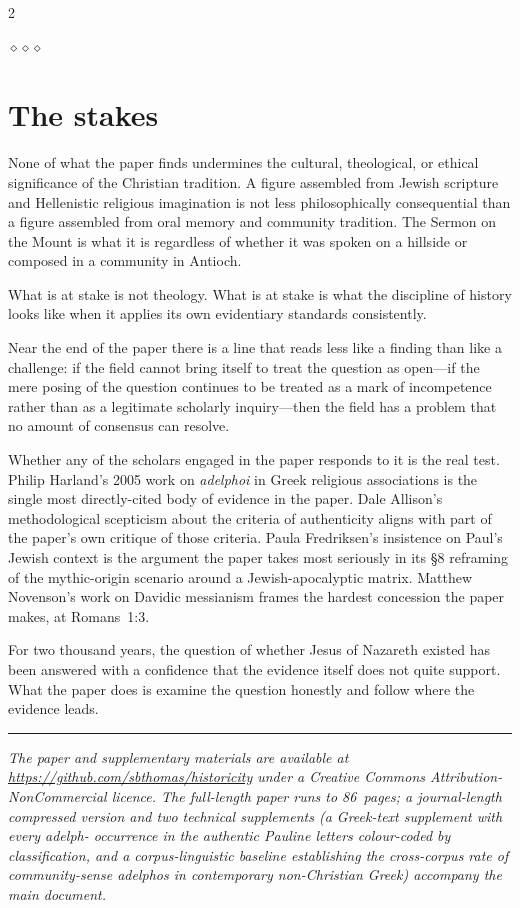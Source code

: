 \documentclass[11pt,oneside]{article}
\newcommand{\sectbreak}{%
  \par\vspace{1.3em}
  \noindent\hfil
  {\color{accent}$\diamond$\hspace{0.5em}$\diamond$\hspace{0.5em}$\diamond$}%
  \hfil\par\vspace{1em}}
\begin{document}
\begin{multicols}{2}
\sectbreak
\section*{The stakes}

None of what the paper finds undermines the cultural, theological,
or ethical significance of the Christian tradition.  A figure
assembled from Jewish scripture and Hellenistic religious
imagination is not less philosophically consequential than a figure
assembled from oral memory and community tradition.  The Sermon on
the Mount is what it is regardless of whether it was spoken on a
hillside or composed in a community in Antioch.

What is at stake is not theology.  What is at stake is what the
discipline of history looks like when it applies its own evidentiary
standards consistently.

Near the end of the paper there is a line that reads less like a
finding than like a challenge: if the field cannot bring itself to
treat the question as open---if the mere posing of the question
continues to be treated as a mark of incompetence rather than as a
legitimate scholarly inquiry---then the field has a problem that no
amount of consensus can resolve.

Whether any of the scholars engaged in the paper responds to it is
the real test.  Philip Harland's 2005 work on \textit{adelphoi} in
Greek religious associations is the single most directly-cited body
of evidence in the paper.  Dale Allison's methodological scepticism
about the criteria of authenticity aligns with part of the paper's
own critique of those criteria.  Paula Fredriksen's insistence on
Paul's Jewish context is the argument the paper takes most seriously
in its §8 reframing of the mythic-origin scenario around a
Jewish-apocalyptic matrix.  Matthew Novenson's work on Davidic
messianism frames the hardest concession the paper makes, at
Romans~1:3.

For two thousand years, the question of whether Jesus of Nazareth
existed has been answered with a confidence that the evidence itself
does not quite support.  What the paper does is examine the question
honestly and follow where the evidence leads.

\end{multicols}

\vspace{1em}
\begin{center}
{\color{rule}\rule{0.4\textwidth}{0.4pt}}
\end{center}
\vspace{0.8em}

{\small\noindent\itshape
The paper and supplementary materials are available at
\url{https://github.com/sbthomas/historicity} under a Creative
Commons Attribution-NonCommercial licence.  The full-length paper
runs to 86~pages; a journal-length compressed version and two
technical supplements (a Greek-text supplement with every
\textit{adelph-} occurrence in the authentic Pauline letters
colour-coded by classification, and a corpus-linguistic baseline
establishing the cross-corpus rate of community-sense
\textit{adelphos} in contemporary non-Christian Greek) accompany
the main document.}
\end{document}
